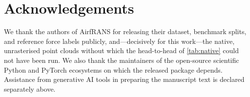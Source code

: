 \section*{Acknowledgements}
We thank the authors of AirfRANS \citep{bonnet2022airfrans} for releasing their dataset,
benchmark splits, and reference
force labels publicly, and---decisively for this work---the native, unrasterised point
clouds without which the head-to-head of \autoref{tab:native} could not have been run. We
also thank the maintainers of the open-source
scientific Python and PyTorch ecosystems on which the released package depends. Assistance
from generative AI tools in preparing the manuscript text is declared separately above.
